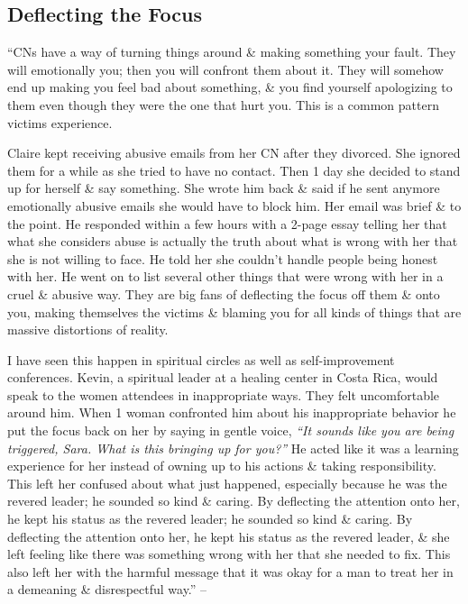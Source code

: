 \documentclass{article}
\numberwithin{equation}{section}
\begin{document}
\subsection{Deflecting the Focus}
``CNs have a way of turning things around \& making something your fault. They will emotionally you; then you will confront them about it. They will somehow end up making you feel bad about something, \& you find yourself apologizing to them even though they were the one that hurt you. This is a common pattern victims experience.

Claire kept receiving abusive emails from her CN after they divorced. She ignored them for a while as she tried to have no contact. Then 1 day she decided to stand up for herself \& say something. She wrote him back \& said if he sent anymore emotionally abusive emails she would have to block him. Her email was brief \& to the point. He responded within a few hours with a 2-page essay telling her that what she considers abuse is actually the truth about what is wrong with her that she is not willing to face. He told her she couldn't handle people being honest with her. He went on to list several other things that were wrong with her in a cruel \& abusive way. They are big fans of deflecting the focus off them \& onto you, making themselves the victims \& blaming you for all kinds of things that are massive distortions of reality.

I have seen this happen in spiritual circles as well as self-improvement conferences. Kevin, a spiritual leader at a healing center in Costa Rica, would speak to the women attendees in inappropriate ways. They felt uncomfortable around him. When 1 woman confronted him about his inappropriate behavior he put the focus back on her by saying in gentle voice, \textit{``It sounds like you are being triggered, Sara. What is this bringing up for you?''} He acted like it was a learning experience for her instead of owning up to his actions \& taking responsibility. This left her confused about what just happened, especially because he was the revered leader; he sounded so kind \& caring. By deflecting the attention onto her, he kept his status as the revered leader; he sounded so kind \& caring. By deflecting the attention onto her, he kept his status as the revered leader, \& she left feeling like there was something wrong with her that she needed to fix. This also left her with the harmful message that it was okay for a man to treat her in a demeaning \& disrespectful way.'' -- \cite[pp. 81--82]{Mirza2017}
\end{document}
